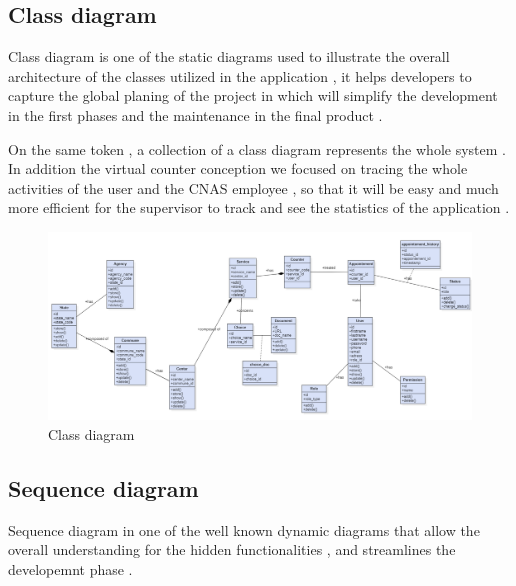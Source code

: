 \subsection{Class diagram}
Class diagram is one of the static diagrams used to illustrate the overall architecture of the classes utilized in the application , it helps developers to capture the global planing of the project in which  will simplify the development in the first phases and the maintenance in the final product . 

\medskip On the same token , a collection of a class diagram represents the whole system . In addition the virtual counter conception we focused on tracing the whole activities of the user and the CNAS employee , so that it will be easy and much more efficient for the supervisor to track and see the statistics of the application . 

\begin{figure}[H]
    \centering
    \includegraphics[width=1.0\textwidth]{class_diagram.PNG}
    \caption{Class diagram}
    \label{fig:Class diagram }
\end{figure}

\subsection{Sequence diagram}
Sequence diagram in one of the well known dynamic diagrams that allow the overall understanding for the hidden functionalities , and streamlines the developemnt phase . 

